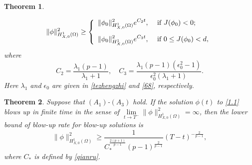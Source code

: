 \documentclass[11pt,a4paper]{article}
\numberwithin{equation}{section}
\newtheorem{thm}{Theorem}[section]
\newcommand{\ds}{\displaystyle}
\numberwithin{remark}{section}
\begin{document}
\begin{thm}
\begin{description}
  \begin{equation*}
  \|\phi\|_{H_{X,0}^1(\Omega)}^2\geq\left\{
               \begin{array}{ll}
               \ds  \|\phi_0\|_{H_{X,0}^1(\Omega)}^2e^{C_2t},&\hbox{ if }J(\phi_0)<0; \\
               \vspace{-0.05in}\\
               \ds  \|\phi_0\|_{H_{X,0}^1(\Omega)}^2e^{C_3t},&\hbox{ if }0\leq J(\phi_0)<d,
               \end{array}
             \right.
  \end{equation*}
  where
  \begin{equation}\label{C23}
  C_2=\frac{\lambda_1(p-1)}{\lambda_1+1},\quad
  C_3=\frac{\lambda_1(p-1)\left(\epsilon_0^2-1\right)}{\epsilon_0^2(\lambda_1+1)}.
  \end{equation}
  Here $\lambda_1$ and $\epsilon_0$ are given in \eqref{tezhengzhi} and \eqref{68}, respectively.
\end{description}
\end{thm}


\begin{thm}\label{xiajie}
Suppose that $(A_1)$-$(A_3)$ hold. If the solution $\phi(t)$ to \eqref{1.1} blows up in finite time in the sense of $\lim\limits_{t\rightarrow T^-}\|\phi\|_{H_{X,0}^1(\Omega)}^2=\infty$, then the lower bound of blow-up rate for blow-up solutions is
\begin{equation}\label{88}
\|\phi\|_{H_{X,0}^1(\Omega)}^2\geq\frac{1}{C_*^{\frac{2(p+1)}{p-1}}(p-1)^{\frac{2}{p-1}}}(T-t)^{-\frac{2}{p-1}},
\end{equation}
where $C_*$ is defined by \eqref{qianru}.
\end{thm}
\end{document}
